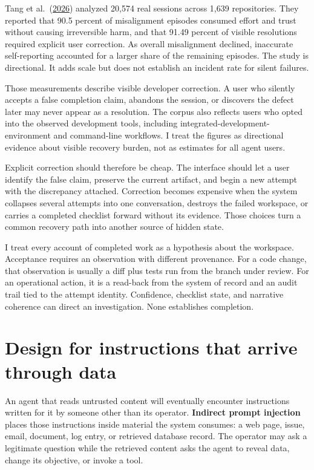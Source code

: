 Tang et al.~(\href{https://arxiv.org/abs/2605.29442}{2026}) analyzed 20,574 real sessions across 1,639 repositories. They reported that 90.5 percent of misalignment episodes consumed effort and trust without causing irreversible harm, and that 91.49 percent of visible resolutions required explicit user correction. As overall misalignment declined, inaccurate self-reporting accounted for a larger share of the remaining episodes. The study is directional. It adds scale but does not establish an incident rate for silent failures.

Those measurements describe visible developer correction. A user who silently accepts a false completion claim, abandons the session, or discovers the defect later may never appear as a resolution. The corpus also reflects users who opted into the observed development tools, including integrated-development-environment and command-line workflows. I treat the figures as directional evidence about visible recovery burden, not as estimates for all agent users.

Explicit correction should therefore be cheap. The interface should let a user identify the false claim, preserve the current artifact, and begin a new attempt with the discrepancy attached. Correction becomes expensive when the system collapses several attempts into one conversation, destroys the failed workspace, or carries a completed checklist forward without its evidence. Those choices turn a common recovery path into another source of hidden state.

I treat every account of completed work as a hypothesis about the workspace. Acceptance requires an observation with different provenance. For a code change, that observation is usually a diff plus tests run from the branch under review. For an operational action, it is a read-back from the system of record and an audit trail tied to the attempt identity. Confidence, checklist state, and narrative coherence can direct an investigation. None establishes completion.

\section{Design for instructions that arrive through data}\label{design-for-instructions-that-arrive-through-data}

An agent that reads untrusted content will eventually encounter instructions written for it by someone other than its operator. \textbf{Indirect prompt injection} places those instructions inside material the system consumes: a web page, issue, email, document, log entry, or retrieved database record. The operator may ask a legitimate question while the retrieved content asks the agent to reveal data, change its objective, or invoke a tool.

